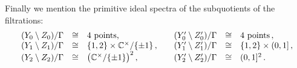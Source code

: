 Finally we mention the primitive ideal spectra of the subquotients of the filtrations:
\[
\begin{array}{lll@{\qquad}lll}
(Y_0 \setminus Z_0 ) / \Gamma & \cong & 4 \text{ points,} & 
(Y'_0 \setminus Z'_0 ) / \Gamma & \cong & 4 \text{ points} \,, \\
(Y_1 \setminus Z_1 ) / \Gamma & \cong & \{ 1,2 \} \times \mh C^\times / \{\pm 1\} \,, &
(Y'_1 \setminus Z'_1 ) / \Gamma & \cong & \{1,2 \} \times (0,1] \,, \\
(Y_2 \setminus Z_2 ) / \Gamma & \cong & \big( \mh C^\times / \{\pm 1\} \big)^2 \,, & 
(Y'_2 \setminus Z'_2 ) / \Gamma & \cong & (0,1]^2 \,.
\end{array}
\]

